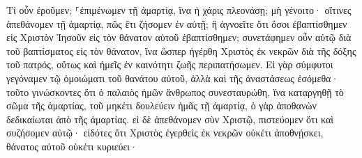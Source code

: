 \documentclass{openreader}
\begin{document}
Τί οὖν ἐροῦμεν; ⸀ἐπιμένωμεν τῇ ἁμαρτίᾳ, ἵνα ἡ χάρις πλεονάσῃ; 
μὴ γένοιτο· οἵτινες ἀπεθάνομεν τῇ ἁμαρτίᾳ, πῶς ἔτι ζήσομεν ἐν αὐτῇ; 
ἢ ἀγνοεῖτε ὅτι ὅσοι ἐβαπτίσθημεν εἰς Χριστὸν Ἰησοῦν εἰς τὸν θάνατον αὐτοῦ ἐβαπτίσθημεν; 
συνετάφημεν οὖν αὐτῷ διὰ τοῦ βαπτίσματος εἰς τὸν θάνατον, ἵνα ὥσπερ ἠγέρθη Χριστὸς ἐκ νεκρῶν διὰ τῆς δόξης τοῦ πατρός, οὕτως καὶ ἡμεῖς ἐν καινότητι ζωῆς περιπατήσωμεν. 
Εἰ γὰρ σύμφυτοι γεγόναμεν τῷ ὁμοιώματι τοῦ θανάτου αὐτοῦ, ἀλλὰ καὶ τῆς ἀναστάσεως ἐσόμεθα· 
τοῦτο γινώσκοντες ὅτι ὁ παλαιὸς ἡμῶν ἄνθρωπος συνεσταυρώθη, ἵνα καταργηθῇ τὸ σῶμα τῆς ἁμαρτίας, τοῦ μηκέτι δουλεύειν ἡμᾶς τῇ ἁμαρτίᾳ, 
ὁ γὰρ ἀποθανὼν δεδικαίωται ἀπὸ τῆς ἁμαρτίας. 
εἰ δὲ ἀπεθάνομεν σὺν Χριστῷ, πιστεύομεν ὅτι καὶ συζήσομεν αὐτῷ· 
εἰδότες ὅτι Χριστὸς ἐγερθεὶς ἐκ νεκρῶν οὐκέτι ἀποθνῄσκει, θάνατος αὐτοῦ οὐκέτι κυριεύει· 
\end{document}
